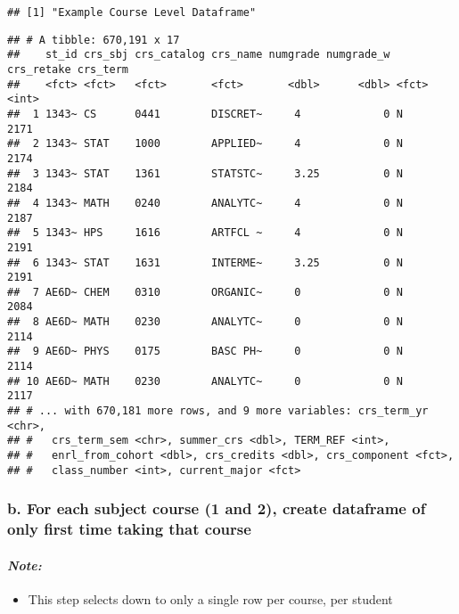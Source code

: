 \documentclass[]{article}
\providecommand{\tightlist}{%
  \setlength{\itemsep}{0pt}\setlength{\parskip}{0pt}}
\let\oldparagraph\paragraph
\renewcommand{\paragraph}[1]{\oldparagraph{#1}\mbox{}}
\begin{document}
\begin{verbatim}
## [1] "Example Course Level Dataframe"
\end{verbatim}

\begin{verbatim}
## # A tibble: 670,191 x 17
##    st_id crs_sbj crs_catalog crs_name numgrade numgrade_w crs_retake crs_term
##    <fct> <fct>   <fct>       <fct>       <dbl>      <dbl> <fct>         <int>
##  1 1343~ CS      0441        DISCRET~     4             0 N              2171
##  2 1343~ STAT    1000        APPLIED~     4             0 N              2174
##  3 1343~ STAT    1361        STATSTC~     3.25          0 N              2184
##  4 1343~ MATH    0240        ANALYTC~     4             0 N              2187
##  5 1343~ HPS     1616        ARTFCL ~     4             0 N              2191
##  6 1343~ STAT    1631        INTERME~     3.25          0 N              2191
##  7 AE6D~ CHEM    0310        ORGANIC~     0             0 N              2084
##  8 AE6D~ MATH    0230        ANALYTC~     0             0 N              2114
##  9 AE6D~ PHYS    0175        BASC PH~     0             0 N              2114
## 10 AE6D~ MATH    0230        ANALYTC~     0             0 N              2117
## # ... with 670,181 more rows, and 9 more variables: crs_term_yr <chr>,
## #   crs_term_sem <chr>, summer_crs <dbl>, TERM_REF <int>,
## #   enrl_from_cohort <dbl>, crs_credits <dbl>, crs_component <fct>,
## #   class_number <int>, current_major <fct>
\end{verbatim}

\subsubsection{b. For each subject course (1 and 2), create dataframe of
only first time taking that
course}\label{b.-for-each-subject-course-1-and-2-create-dataframe-of-only-first-time-taking-that-course}

\paragraph{\texorpdfstring{\emph{Note:}}{Note:}}\label{note-3}

\begin{itemize}
\tightlist
\item
  This step selects down to only a single row per course, per student
\end{itemize}
\end{document}
